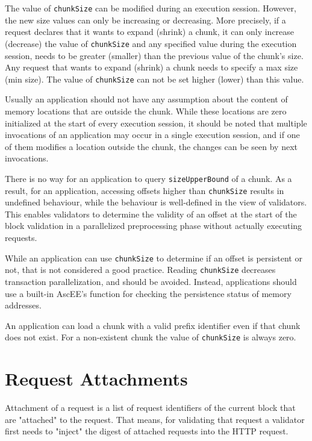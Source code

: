 The value of \texttt{chunkSize} can be modified during an execution session. However, the new size values can only be
increasing or decreasing. More precisely, if a request declares that it wants to expand (shrink) a chunk, it can only
increase (decrease) the value of \texttt{chunkSize} and any specified value during the execution
session, needs to be greater (smaller) than the previous value of the chunk's size. Any request that wants to expand
(shrink) a chunk needs to specify a max size (min size). The value of \texttt{chunkSize} can not be set higher
(lower) than this value.

Usually an application should not have any assumption about the content of memory locations that are outside the chunk.
While these locations are zero initialized at the start of every execution session, it should be noted that multiple
invocations of an application may occur in a single execution session, and if one of them modifies a location outside
the chunk, the changes can be seen by next invocations.

There is no way for an application to query \texttt{sizeUpperBound} of a chunk. As a result, for an application,
accessing offsets higher than \texttt{chunkSize} results in undefined behaviour, while the behaviour is well-defined
in the view of validators.
This enables validators to determine the validity of an offset at the start of the block validation in a parallelized
preprocessing phase without actually executing requests.

While an application can use \texttt{chunkSize} to determine if an offset is persistent or not, that is not
considered a good practice. Reading \texttt{chunkSize} decreases transaction parallelization, and should be avoided.
Instead, applications should use a built-in AscEE's function for checking the persistence status of memory addresses.

An application can load a chunk with a valid prefix identifier even if that chunk does not exist. For a non-existent
chunk the value of \texttt{chunkSize} is always zero.


\section{Request Attachments}\label{sec:attachments}

Attachment of a request is a list of request identifiers of the current block that are "attached" to the request.
That means, for validating that request a validator first needs to "inject" the digest of attached requests into the
HTTP request.


